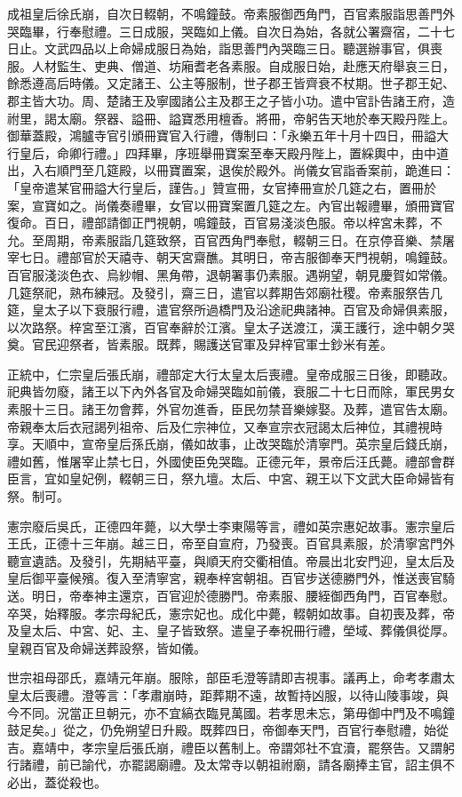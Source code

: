 成祖皇后徐氏崩，自次日輟朝，不鳴鐘鼓。帝素服御西角門，百官素服詣思善門外哭臨畢，行奉慰禮。三日成服，哭臨如上儀。自次日為始，各就公署齋宿，二十七日止。文武四品以上命婦成服日為始，詣思善門內哭臨三日。聽選辦事官，俱喪服。人材監生、吏典、僧道、坊廂耆老各素服。自成服日始，赴應天府舉哀三日，餘悉遵高后時儀。又定諸王、公主等服制，世子郡王皆齊衰不杖期。世子郡王妃、郡主皆大功。周、楚諸王及寧國諸公主及郡王之子皆小功。遣中官訃告諸王府，造祔里，謁太廟。祭器、謚冊、謚寶悉用檀香。將冊，帝躬告天地於奉天殿丹陛上。御華蓋殿，鴻臚寺官引頒冊寶官入行禮，傳制曰：「永樂五年十月十四日，冊謚大行皇后，命卿行禮。」四拜畢，序班舉冊寶案至奉天殿丹陛上，置綵輿中，由中道出，入右順門至几筵殿，以冊寶置案，退俟於殿外。尚儀女官詣香案前，跪進曰：「皇帝遣某官冊謚大行皇后，謹告。」贊宣冊，女官捧冊宣於几筵之右，置冊於案，宣寶如之。尚儀奏禮畢，女官以冊寶案置几筵之左。內官出報禮畢，頒冊寶官復命。百日，禮部請御正門視朝，鳴鐘鼓，百官易淺淡色服。帝以梓宮未葬，不允。至周期，帝素服詣几筵致祭，百官西角門奉慰，輟朝三日。在京停音樂、禁屠宰七日。禮部官於天禧寺、朝天宮齋醮。其明日，帝吉服御奉天門視朝，鳴鐘鼓。百官服淺淡色衣、烏紗帽、黑角帶，退朝署事仍素服。遇朔望，朝見慶賀如常儀。几筵祭祀，熟布練冠。及發引，齋三日，遣官以葬期告郊廟社稷。帝素服祭告几筵，皇太子以下衰服行禮，遣官祭所過橋門及沿途祀典諸神。百官及命婦俱素服，以次路祭。梓宮至江濱，百官奉辭於江濱。皇太子送渡江，漢王護行，途中朝夕哭奠。官民迎祭者，皆素服。既葬，賜護送官軍及舁梓官軍士鈔米有差。

正統中，仁宗皇后張氏崩，禮部定大行太皇太后喪禮。皇帝成服三日後，即聽政。祀典皆勿廢，諸王以下內外各官及命婦哭臨如前儀，衰服二十七日而除，軍民男女素服十三日。諸王勿會葬，外官勿進香，臣民勿禁音樂嫁娶。及葬，遣官告太廟。帝親奉太后衣冠謁列祖帝、后及仁宗神位，又奉宣宗衣冠謁太后神位，其禮視時享。天順中，宣帝皇后孫氏崩，儀如故事，止改哭臨於清寧門。英宗皇后錢氏崩，禮如舊，惟屠宰止禁七日，外國使臣免哭臨。正德元年，景帝后汪氏薨。禮部會群臣言，宜如皇妃例，輟朝三日，祭九壇。太后、中宮、親王以下文武大臣命婦皆有祭。制可。

憲宗廢后吳氏，正德四年薨，以大學士李東陽等言，禮如英宗惠妃故事。憲宗皇后王氏，正德十三年崩。越三日，帝至自宣府，乃發喪。百官具素服，於清寧宮門外聽宣遺誥。及發引，先期結平臺，與順天府交衢相值。帝晨出北安門迎，皇太后及皇后御平臺候殯。復入至清寧宮，親奉梓宮朝祖。百官步送德勝門外，惟送喪官騎送。明日，帝奉神主還京，百官迎於德勝門。帝素服、腰絰御西角門，百官奉慰。卒哭，始釋服。孝宗母紀氏，憲宗妃也。成化中薨，輟朝如故事。自初喪及葬，帝及皇太后、中宮、妃、主、皇子皆致祭。遣皇子奉祝冊行禮，塋域、葬儀俱從厚。皇親百官及命婦送葬設祭，皆如儀。

世宗祖母邵氏，嘉靖元年崩。服除，部臣毛澄等請即吉視事。議再上，命考孝肅太皇太后喪禮。澄等言：「孝肅崩時，距葬期不遠，故暫持凶服，以待山陵事竣，與今不同。況當正旦朝元，亦不宜縞衣臨見萬國。若孝思未忘，第毋御中門及不鳴鐘鼓足矣。」從之，仍免朔望日升殿。既葬四日，帝御奉天門，百官行奉慰禮，始從吉。嘉靖中，孝宗皇后張氏崩，禮臣以舊制上。帝謂郊社不宜瀆，罷祭告。又謂躬行諸禮，前已諭代，亦罷謁廟禮。及太常寺以朝祖祔廟，請各廟捧主官，詔主俱不必出，蓋從殺也。

